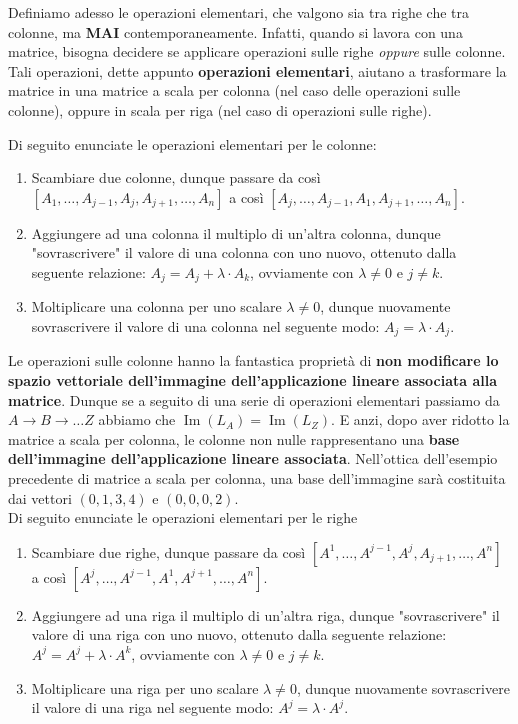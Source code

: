 \documentclass[12pt]{report}
\begin{document}
	Definiamo adesso le operazioni elementari, che valgono sia tra righe che tra colonne, ma \textbf{MAI} contemporaneamente. Infatti, quando si lavora con una matrice, bisogna decidere se applicare operazioni sulle righe \textit{oppure} sulle colonne. Tali operazioni, dette appunto \textbf{operazioni elementari}, aiutano a trasformare la matrice in una matrice a scala per colonna (nel caso delle operazioni sulle colonne), oppure in scala per riga (nel caso di operazioni sulle righe).
	
	Di seguito enunciate le operazioni elementari per le colonne:
	
	\begin{enumerate}
		\item Scambiare due colonne, dunque passare da così $[A_1, \dots, A_{j-1}, A_j, A_{j+1}, \dots, A_n]$ a così $[A_j, \dots, A_{j-1}, A_1, A_{j+1}, \dots, A_n]$.
		\item Aggiungere ad una colonna il multiplo di un'altra colonna, dunque "sovrascrivere" il valore di una colonna con uno nuovo, ottenuto dalla seguente relazione: $A_j = A_j + \lambda \cdot A_k$, ovviamente con $\lambda \neq 0$ e $j \neq k$.
		\item Moltiplicare una colonna per uno scalare $\lambda \neq 0$, dunque nuovamente sovrascrivere il valore di una colonna nel seguente modo: $A_j = \lambda \cdot A_j$.
	\end{enumerate}
	
	Le operazioni sulle colonne hanno la fantastica proprietà di \textbf{non modificare lo spazio vettoriale dell'immagine dell'applicazione lineare associata alla matrice}.
	Dunque se a seguito di una serie di operazioni elementari passiamo da $A \to B \to \dots Z$ abbiamo che $\operatorname{Im}(L_A) = \operatorname{Im}(L_Z)$.
	E anzi, dopo aver ridotto la matrice a scala per colonna, le colonne non nulle rappresentano una \textbf{base dell'immagine dell'applicazione lineare associata}. Nell'ottica dell'esempio precedente di matrice a scala per colonna, una base dell'immagine sarà costituita dai vettori $(0, 1, 3, 4)$ e $(0, 0, 0, 2)$.\\
	
	Di seguito enunciate le operazioni elementari per le righe
	
	\begin{enumerate}
		\item Scambiare due righe, dunque passare da così $[A^1, \dots, A^{j-1}, A^j, A_{j+1}, \dots, A^n]$ a così $[A^j, \dots, A^{j-1}, A^1, A^{j+1}, \dots, A^n]$.
		\item Aggiungere ad una riga il multiplo di un'altra riga, dunque "sovrascrivere" il valore di una riga con uno nuovo, ottenuto dalla seguente relazione: $A^j = A^j + \lambda \cdot A^k$, ovviamente con $\lambda \neq 0$ e $j \neq k$.
		\item Moltiplicare una riga per uno scalare $\lambda \neq 0$, dunque nuovamente sovrascrivere il valore di una riga nel seguente modo: $A^j = \lambda \cdot A^j$.
	\end{enumerate}
	
\end{document}
